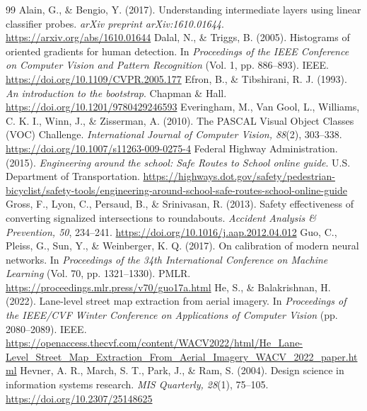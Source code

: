 \documentclass[11pt]{article}
\begin{document}
\clearpage
\begin{thebibliography}{99}
 Alain, G., \& Bengio, Y. (2017). Understanding intermediate layers using linear classifier probes. \emph{arXiv preprint arXiv:1610.01644}. \url{https://arxiv.org/abs/1610.01644}
 Dalal, N., \& Triggs, B. (2005). Histograms of oriented gradients for human detection. In \emph{Proceedings of the IEEE Conference on Computer Vision and Pattern Recognition} (Vol. 1, pp. 886--893). IEEE. \url{https://doi.org/10.1109/CVPR.2005.177}
 Efron, B., \& Tibshirani, R. J. (1993). \emph{An introduction to the bootstrap}. Chapman \& Hall. \url{https://doi.org/10.1201/9780429246593}
 Everingham, M., Van Gool, L., Williams, C. K. I., Winn, J., \& Zisserman, A. (2010). The PASCAL Visual Object Classes (VOC) Challenge. \emph{International Journal of Computer Vision, 88}(2), 303--338. \url{https://doi.org/10.1007/s11263-009-0275-4}
 Federal Highway Administration. (2015). \emph{Engineering around the school: Safe Routes to School online guide}. U.S. Department of Transportation. \url{https://highways.dot.gov/safety/pedestrian-bicyclist/safety-tools/engineering-around-school-safe-routes-school-online-guide}
 Gross, F., Lyon, C., Persaud, B., \& Srinivasan, R. (2013). Safety effectiveness of converting signalized intersections to roundabouts. \emph{Accident Analysis \& Prevention, 50}, 234--241. \url{https://doi.org/10.1016/j.aap.2012.04.012}
 Guo, C., Pleiss, G., Sun, Y., \& Weinberger, K. Q. (2017). On calibration of modern neural networks. In \emph{Proceedings of the 34th International Conference on Machine Learning} (Vol. 70, pp. 1321--1330). PMLR. \url{https://proceedings.mlr.press/v70/guo17a.html}
 He, S., \& Balakrishnan, H. (2022). Lane-level street map extraction from aerial imagery. In \emph{Proceedings of the IEEE/CVF Winter Conference on Applications of Computer Vision} (pp. 2080--2089). IEEE. \url{https://openaccess.thecvf.com/content/WACV2022/html/He_Lane-Level_Street_Map_Extraction_From_Aerial_Imagery_WACV_2022_paper.html}
 Hevner, A. R., March, S. T., Park, J., \& Ram, S. (2004). Design science in information systems research. \emph{MIS Quarterly, 28}(1), 75--105. \url{https://doi.org/10.2307/25148625}

\end{thebibliography}
\end{document}
